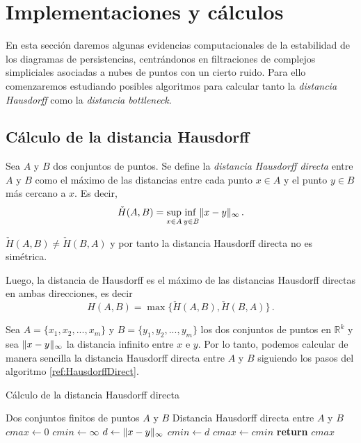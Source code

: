 \section{Implementaciones y cálculos}\label{sec:impl}
En esta sección daremos algunas evidencias computacionales de la estabilidad de los diagramas de persistencias, centrándonos en filtraciones de complejos simpliciales asociadas a nubes de puntos con un cierto ruido. Para ello comenzaremos estudiando posibles algoritmos para calcular tanto la \emph{distancia Hausdorff} como la \emph{distancia bottleneck}. 
\subsection{Cálculo de la distancia Hausdorff}

\begin{definition}
Sea $A$ y $B$ dos conjuntos de puntos. Se define la \emph{distancia Hausdorff directa} entre $A$ y $B$ como el máximo de las distancias entre cada punto $x \in A$ y el punto $y \in B$ más cercano a $x$. Es decir,
\[
\check{H}(A,B)= \adjustlimits\sup_{x \in A} \inf_{y \in B} \norm{x-y}_\infty\,.
\]
\end{definition}

\begin{remark}
$\check{H}(A,B) \neq \check{H}(B,A)$ y por tanto la distancia Hausdorff directa no es simétrica.
\end{remark}

Luego, la distancia de Hausdorff es el máximo de las distancias Hausdorff directas en ambas direcciones, es decir
\[
H(A,B) = \max\{\check{H}(A,B), \check{H}(B,A)\}\,.
\]

Sea $A=\{x_1, x_2, ...,x_m\}$ y $B=\{y_1, y_2, ...,y_m\}$ los dos conjuntos de puntos en $\mathbb{R}^k$ y sea $\lVert x-y\rVert_\infty$ la distancia infinito entre $x$ e $y$. Por lo tanto, podemos calcular de manera sencilla la distancia Hausdorff directa entre $A$ y $B$ siguiendo los pasos del algoritmo \ref{ref:HausdorffDirect}.

\begin{algorithm}[!ht]
\caption{Cálculo de la distancia Hausdorff directa {\cite[NAIVEHDD]{ArticuloHausdorff}}}\label{ref:HausdorffDirect}
\begin{algorithmic}[1]
\Require Dos conjuntos finitos de puntos $A$ y $B$
\Ensure Distancia Hausdorff directa entre $A$ y $B$
\State $cmax\gets 0$
	\State $cmin\gets \infty$
		\State $d\gets \lVert x-y\rVert_\infty$
			\State $cmin\gets d$
		\EndIf
	\EndFor
		\State $cmax\gets cmin$
	\EndIf
\EndFor
\State \textbf{return} $cmax$
\end{algorithmic}
\end{algorithm}

